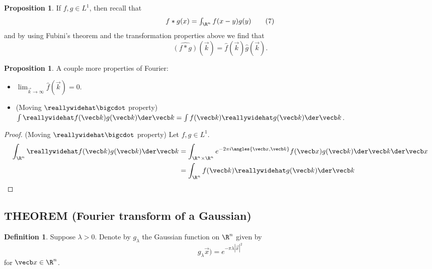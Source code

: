 \documentclass[a5paper]{article}
\theoremstyle{definition}%
\newtheorem{proposition}[theorem]{Proposition}
\newtheorem*{definition*}{Definition}
\numberwithin{exercise}{section}
\theoremstyle{remark}%
\renewcommand{\L}{L}
\begin{document}
\begin{highlight}
\begin{proposition}
If $f,g\in L^1$, then recall that 
\begin{equation}
f*g(x)=\textstyle \int_{\R^n}f(x-y)g(y)\tag{$7$}
\end{equation} and by using Fubini's theorem and the transformation properties above we find that 
\begin{equation}
\widehat{(f*g)}(\vec{k})=\widehat{f}(\vec{k}) \widehat{g}(\vec{k}).\tag{$8$}
\end{equation}
\end{proposition}
\end{highlight}

\begin{highlight}
\begin{proposition}
A couple more properties of Fourier:
\begin{itemize}
	\item $\lim_{\vec{k}\to\infty}\hat{f}(\vec{k})=0.$
	\item (Moving $\hat{\bigcdot}$ property) $\int \hat{f}(\vec{k})g(\vec{k})\der\vec{k}=\int {f}(\vec{k})\hat{g}(\vec{k})\der\vec{k}$.
\end{itemize}
\end{proposition}
\end{highlight}
\begin{proof}(Moving $\hat{\bigcdot}$ property)
Let $f,g\in\L^1$. 
\begin{align*}
\int_{\Rn} \hat{f}(\vec{k})g(\vec{k})\der\vec{k}
&= \int_{\Rn\times\Rn} e^{-2\pi i\angles{\vec{x},\vec{k}}}{f}(\vec{x})g(\vec{k})\der\vec{k}\der\vec{x}\\
&=\int_{\Rn} {f}(\vec{k})\hat{g}(\vec{k})\der\vec{k} \qedhere
\end{align*}
\end{proof}



\subsection{THEOREM (Fourier transform of a Gaussian)}
\begin{definition*}
Suppose $\lambda>0$. Denote by $g_\lambda$ the Gaussian function on $\R^n$ given by
\begin{equation}
g_\lambda\vec x) = e^{-\pi\lambda|\vec x|^2} \tag{$1$}
\end{equation}
for $\vec x\in \R^n$. 
\end{definition*}
\end{document}
